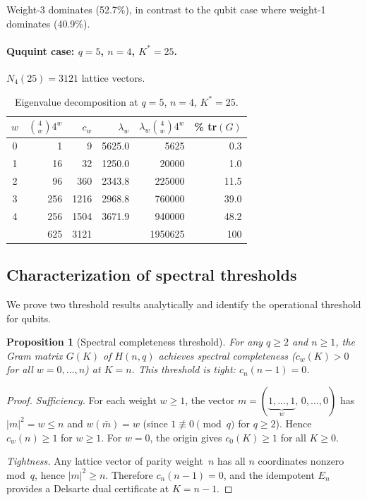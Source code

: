 \documentclass[twocolumn,prx,aps,superscriptaddress,longbibliography]{revtex4-2}
\newtheorem{proposition}{Proposition}
\newcommand{\pclaim}[4]{}
\begin{document}
Weight-3 dominates (52.7\%), in contrast to the qubit
case where weight-1 dominates (40.9\%).

\paragraph{Ququint case: $q = 5$, $n = 4$, $K^* = 25$.}
$N_4(25) = 3121$ lattice vectors.

\begin{table}[ht!]
\caption{Eigenvalue decomposition at $q = 5$, $n = 4$, $K^* = 25$.}
\label{tab:q5}
\begin{ruledtabular}
\begin{tabular}{crrrrr}
$w$ & $\binom{4}{w}4^w$ & $c_w$ & $\lambda_w$ &
$\lambda_w \binom{4}{w}4^w$ & \% tr$(G)$ \\
\hline
0 & 1   & 9    & 5625.0  & 5625    & 0.3  \\
1 & 16  & 32   & 1250.0  & 20000   & 1.0  \\
2 & 96  & 360  & 2343.8  & 225000  & 11.5 \\
3 & 256 & 1216 & 2968.8  & 760000  & 39.0 \\
4 & 256 & 1504 & 3671.9  & 940000  & 48.2 \\
\hline
  & 625 & 3121 &         & 1950625 & 100  \\
\end{tabular}
\end{ruledtabular}
\end{table}

\subsection{Characterization of spectral thresholds}
\label{sec:threshold}

We prove two threshold results analytically and
identify the operational threshold for qubits.

\pclaim{env:prop:spec-complete}{proved}{n>=1,q>=2}{prop:spec-complete}%
\begin{proposition}[Spectral completeness threshold]
\label{prop:spec-complete}
For any $q \ge 2$ and $n \ge 1$, the Gram matrix $G(K)$
of $H(n,q)$ achieves spectral completeness ($c_w(K) > 0$
for all $w = 0, \ldots, n$) at $K = n$.
This threshold is tight: $c_n(n{-}1) = 0$.
\end{proposition}
\begin{proof}
\emph{Sufficiency.}
For each weight $w \ge 1$, the vector
$m = (\underbrace{1,\ldots,1}_{w},\, 0,\ldots,0)$ has
$|m|^2 = w \le n$ and $w(\bar{m}) = w$ (since $1 \not\equiv 0
\pmod{q}$ for $q \ge 2$).  Hence $c_w(n) \ge 1$ for $w \ge 1$.
For $w = 0$, the origin gives $c_0(K) \ge 1$ for all $K \ge 0$.

\emph{Tightness.}
Any lattice vector of parity weight~$n$ has all $n$
coordinates nonzero mod~$q$, hence $|m|^2 \ge n$.
Therefore $c_n(n{-}1) = 0$, and the idempotent $E_n$
provides a Delsarte dual certificate at $K = n{-}1$.
\end{proof}
\end{document}
